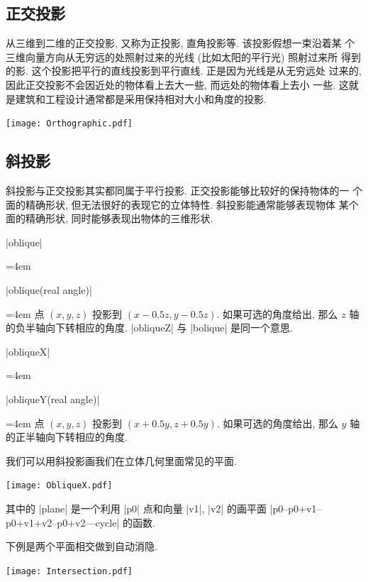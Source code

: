 \documentclass{ctexbook}
\newenvironment{funclist}{\trivlist
  \parindent=0pt
\item[]
  \def\item{\medskip\par\leftskip=0pt}
  \def\go{\par\leftskip=4em}}
{\endtrivlist}
\begin{document}
\subsection{正交投影}
从三维到二维的正交投影, 又称为正投影, 直角投影等. 该投影假想一束沿着某
个三维向量方向从无穷远的处照射过来的光线 (比如太阳的平行光) 照射过来所
得到的影. 这个投影把平行的直线投影到平行直线. 正是因为光线是从无穷远处
过来的, 因此正交投影不会因近处的物体看上去大一些, 而远处的物体看上去小
一些. 这就是建筑和工程设计通常都是采用保持相对大小和角度的投影.
\begin{center}\texttt{[image: Orthographic.pdf]}\end{center}%


\subsection{斜投影}
斜投影与正交投影其实都同属于平行投影. 正交投影能够比较好的保持物体的一
个面的精确形状, 但无法很好的表现它的立体特性. 斜投影能通常能够表现物体
某个面的精确形状, 同时能够表现出物体的三维形状.
\begin{funclist}
\item |oblique| \go
\item |oblique(real angle)| \go
  点 $(x,y,z)$ 投影到 $(x-0.5z,y-0.5z)$. 如果可选的角度给出, 那么 $z$ 轴
  的负半轴向下转相应的角度. |obliqueZ| 与 |bolique| 是同一个意思.
\item |obliqueX| \go
\item |obliqueY(real angle)| \go
  点 $(x,y,z)$ 投影到 $(x+0.5y,z+0.5y)$. 如果可选的角度给出, 那么 $y$ 轴
  的正半轴向下转相应的角度.
\end{funclist}

我们可以用斜投影画我们在立体几何里面常见的平面.
\begin{center}\texttt{[image: ObliqueX.pdf]}\end{center}%


其中的 |plane| 是一个利用 |p0| 点和向量 |v1|, |v2| 的画平面
|p0--p0+v1--p0+v1+v2--p0+v2---cycle| 的函数.

下例是两个平面相交做到自动消隐.
\begin{center}\texttt{[image: Intersection.pdf]}\end{center}%

\end{document}
